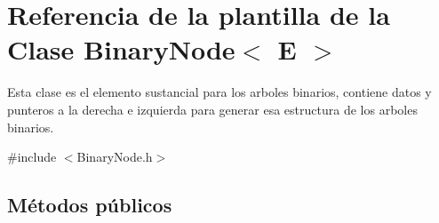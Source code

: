 \hypertarget{classBinaryNode}{\section{Referencia de la plantilla de la Clase Binary\-Node$<$ E $>$}
\label{classBinaryNode}
}


Esta clase es el elemento sustancial para los arboles binarios, contiene datos y punteros a la derecha e izquierda para generar esa estructura de los arboles binarios.  




{\ttfamily \#include $<$Binary\-Node.\-h$>$}

\subsection*{Métodos públicos}
